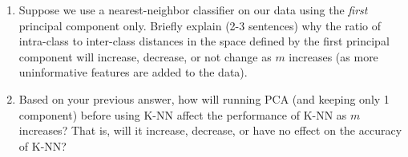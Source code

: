 \begin{enumerate}
\item {} Suppose we use a nearest-neighbor classifier on our
  data using the {\em first} principal component only.  Briefly
  explain (2-3 sentences) why the ratio of intra-class to inter-class
  distances in the space defined by the first principal component will
  increase, decrease, or not change as $m$ increases (as more
  uninformative features are added to the data).

\item {} Based on your previous answer, how will running PCA
  (and keeping only 1 component) before using K-NN affect the
  performance of K-NN as $m$ increases?  That is, will it increase,
  decrease, or have no effect on the accuracy of K-NN?

\end{enumerate}
